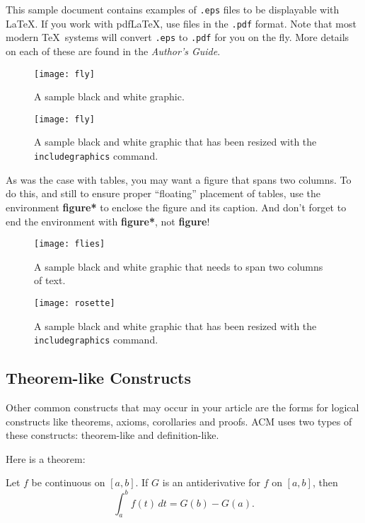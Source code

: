 This sample document contains examples of \texttt{.eps} files to be
displayable with \LaTeX.  If you work with pdf\LaTeX, use files in the
\texttt{.pdf} format.  Note that most modern \TeX\ systems will convert
\texttt{.eps} to \texttt{.pdf} for you on the fly.  More details on
each of these are found in the \textit{Author's Guide}.

\begin{figure}
\texttt{[image: fly]}
\caption{A sample black and white graphic.}
\end{figure}

\begin{figure}
\texttt{[image: fly]}
\caption{A sample black and white graphic
that has been resized with the \texttt{includegraphics} command.}
\end{figure}


As was the case with tables, you may want a figure that spans two
columns.  To do this, and still to ensure proper ``floating''
placement of tables, use the environment \textbf{figure*} to enclose
the figure and its caption.  And don't forget to end the environment
with \textbf{figure*}, not \textbf{figure}!

\begin{figure*}
\texttt{[image: flies]}
\caption{A sample black and white graphic
that needs to span two columns of text.}
\end{figure*}


\begin{figure}
\texttt{[image: rosette]}
\caption{A sample black and white graphic that has
been resized with the \texttt{includegraphics} command.}
\end{figure}

\subsection{Theorem-like Constructs}

Other common constructs that may occur in your article are the forms
for logical constructs like theorems, axioms, corollaries and proofs.
ACM uses two types of these constructs:  theorem-like and
definition-like.

Here is a theorem:
\begin{theorem}
  Let $f$ be continuous on $[a,b]$.  If $G$ is
  an antiderivative for $f$ on $[a,b]$, then
  \begin{displaymath}
    \int^b_af(t)\,dt = G(b) - G(a).
  \end{displaymath}
\end{theorem}

